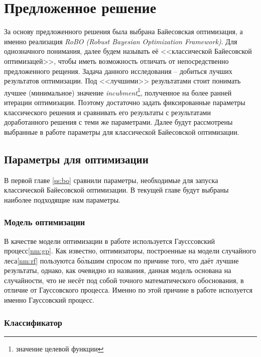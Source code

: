 \documentclass[times,specification,annotation]{itmo-student-thesis}
\begin{document}
	\chapter{Предложенное решение}
	За основу предложенного решения была выбрана Байесовская оптимизация, а именно реализация \textit{RoBO (Robust Bayesian Optimization Framework)}\cite{klein-bayesopt17}. Для однозначного понимания, далее будем называть её <<классической Байесовской оптимизацей>>, чтобы иметь возможность отличать от непосредственно предложенного рещения. Задача данного исследования -- добиться лучших результатов оптимизации. Под <<лучшими>> результатами стоит понимать лучшее (минимальное) значение \textit{incubment}\footnote{значение целевой функции}, полученное на более ранней итерации оптимизации. Поэтому достаточно задать фиксированные параметры классического решения и сравнивать его результаты с результатами доработанного решения с теми же параметрами. Далее будут рассмотрены выбранные в работе параметры для классической Байесовской оптимизации.
	
	\section{Параметры для оптимизации}
	В первой главе \ref{ss:bo} сравнили параметры, необходимые для запуска классической Байесовской оптимизации. В текущей главе будут выбраны наиболее подходящие нам параметры.
		\subsection{Модель оптимизации}
		В качестве модели оптимизации в работе используется Гаусссовский процесс\ref{nm:gp}. Как известно, оптимизаторы, построенные на модели случайного леса\ref{nm:rf} пользуютса б\'ольшим спросом по причине того, что даёт лучшие результаты, однако, как очевидно из названия, данная модель основана на случайности, что не несёт под собой точного математического обоснования, в отличие от Гауссовского процесса. Именно по этой причине в работе исполуется именно Гауссовский процесс.
		\subsection{Классификатор}
\end{document}
